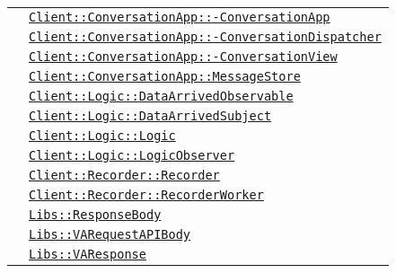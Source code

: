 \begin{longtable}{|>{\centering}m{3cm}|m{10cm}<{\centering}|}
& \hyperref[Client::ConversationApp::ConversationApp]{\texttt{Client::ConversationApp::-\linebreak ConversationApp}}\\
& \hyperref[Client::ConversationApp::ConversationDispatcher]{\texttt{Client::ConversationApp::-\linebreak ConversationDispatcher}}\\
& \hyperref[Client::ConversationApp::ConversationView]{\texttt{Client::ConversationApp::-\linebreak ConversationView}}\\
& \hyperref[Client::ConversationApp::MessageStore]{\texttt{Client::ConversationApp::MessageStore}}\\
& \hyperref[Client::Logic::DataArrivedObservable]{\texttt{Client::Logic::DataArrivedObservable}}\\
& \hyperref[Client::Logic::DataArrivedSubject]{\texttt{Client::Logic::DataArrivedSubject}}\\
& \hyperref[Client::Logic::Logic]{\texttt{Client::Logic::Logic}}\\
& \hyperref[Client::Logic::LogicObserver]{\texttt{Client::Logic::LogicObserver}}\\
& \hyperref[Client::Recorder::Recorder]{\texttt{Client::Recorder::Recorder}}\\
& \hyperref[Client::Recorder::RecorderWorker]{\texttt{Client::Recorder::RecorderWorker}}\\
& \hyperref[Libs::ResponseBody]{\texttt{Libs::ResponseBody}}\\
& \hyperref[Libs::VARequestAPIBody]{\texttt{Libs::VARequestAPIBody}}\\
& \hyperref[Libs::VAResponse]{\texttt{Libs::VAResponse}}\\ \hline


\end{longtable}

